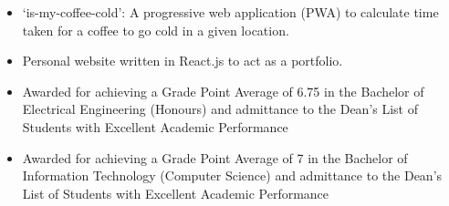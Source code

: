
	

	\begin{itemize}
		\item `is-my-coffee-cold': A progressive web application (PWA) to calculate time taken for a coffee to go cold in a given location.		
		\item Personal website written in React.js to act as a portfolio.
	\end{itemize}

	\begin{itemize}
		\item  Awarded for achieving a Grade Point Average of 6.75 in the Bachelor of Electrical Engineering
 (Honours) and admittance to the Dean's List of Students with Excellent Academic
 Performance
	\end{itemize}
	\begin{itemize}
		\item  Awarded for achieving a Grade Point Average of 7 in the Bachelor of Information Technology
 (Computer Science) and admittance to the Dean's List of Students with Excellent Academic
 Performance
	\end{itemize}

